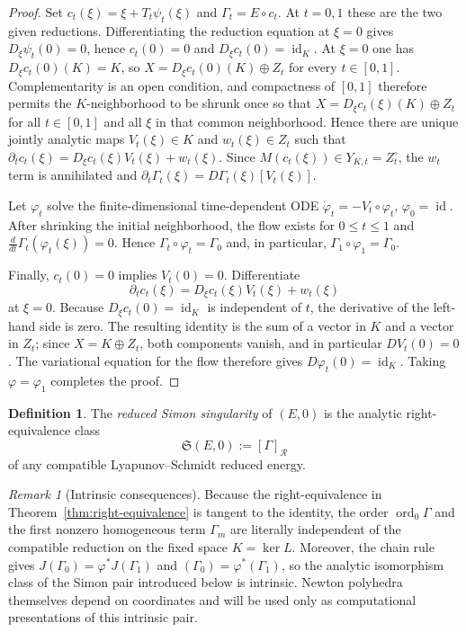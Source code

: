 \documentclass[11pt]{article}
\theoremstyle{definition}
\newtheorem{definition}[theorem]{Definition}
\theoremstyle{remark}
\newtheorem{remark}[theorem]{Remark}
\begin{document}
\begin{proof}
Set $c_t(\xi)=\xi+T_t\psi_t(\xi)$ and $\Gamma_t=E\circ c_t$. At $t=0,1$ these are the two given reductions. Differentiating the reduction equation at $\xi=0$ gives $D_\xi\psi_t(0)=0$, hence $c_t(0)=0$ and $D_\xi c_t(0)=\operatorname{id}_K$. At $\xi=0$ one has $D_\xi c_t(0)(K)=K$, so $X=D_\xi c_t(0)(K)\oplus Z_t$ for every $t\in[0,1]$. Complementarity is an open condition, and compactness of $[0,1]$ therefore permits the $K$-neighborhood to be shrunk once so that
$X=D_\xi c_t(\xi)(K)\oplus Z_t$ for all $t\in[0,1]$ and all $\xi$ in that common neighborhood. Hence there are unique jointly analytic maps $V_t(\xi)\in K$ and $w_t(\xi)\in Z_t$ such that
$\partial_tc_t(\xi)=D_\xi c_t(\xi)V_t(\xi)+w_t(\xi)$. Since $M(c_t(\xi))\in Y_{K,t}=Z_t^\circ$, the $w_t$ term is annihilated and
$\partial_t\Gamma_t(\xi)=D\Gamma_t(\xi)[V_t(\xi)]$.

Let $\varphi_t$ solve the finite-dimensional time-dependent ODE
$\dot\varphi_t=-V_t\circ\varphi_t$, $\varphi_0=\operatorname{id}$. After shrinking the initial neighborhood, the flow exists for $0\le t\le1$ and
$\frac{d}{dt}\Gamma_t(\varphi_t(\xi))=0$. Hence $\Gamma_t\circ\varphi_t=\Gamma_0$ and, in particular, $\Gamma_1\circ\varphi_1=\Gamma_0$.

Finally, $c_t(0)=0$ implies $V_t(0)=0$. Differentiate
$$
\partial_tc_t(\xi)=D_\xi c_t(\xi)V_t(\xi)+w_t(\xi)
$$
at $\xi=0$. Because $D_\xi c_t(0)=\operatorname{id}_K$ is independent of $t$, the derivative of the left-hand side is zero. The resulting identity is the sum of a vector in $K$ and a vector in $Z_t$; since $X=K\oplus Z_t$, both components vanish, and in particular $DV_t(0)=0$. The variational equation for the flow therefore gives $D\varphi_t(0)=\operatorname{id}_K$. Taking $\varphi=\varphi_1$ completes the proof.
\end{proof}

\begin{definition}
The \emph{reduced Simon singularity} of $(E,0)$ is the analytic right-equivalence class
$$
\mathfrak S(E,0):=[\Gamma]_{\mathcal R}
$$
of any compatible Lyapunov--Schmidt reduced energy.
\end{definition}

\begin{remark}[Intrinsic consequences]\label{rem:intrinsic-consequences}
Because the right-equivalence in Theorem~\ref{thm:right-equivalence} is tangent to the identity, the order $\operatorname{ord}_0\Gamma$ and the first nonzero homogeneous term $\Gamma_m$ are literally independent of the compatible reduction on the fixed space $K=\ker L$. Moreover, the chain rule gives $J(\Gamma_0)=\varphi^*J(\Gamma_1)$ and $(\Gamma_0)=\varphi^*(\Gamma_1)$, so the analytic isomorphism class of the Simon pair introduced below is intrinsic. Newton polyhedra themselves depend on coordinates and will be used only as computational presentations of this intrinsic pair.
\end{remark}
\end{document}
